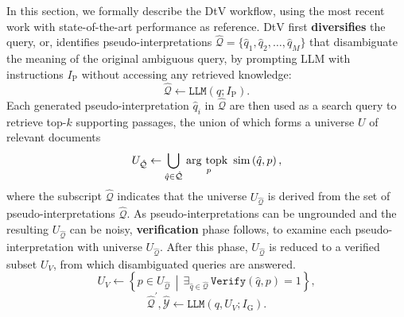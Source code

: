 In this section, we formally describe 
the DtV workflow, using the most recent work \citet{in-etal-2024-diversify-arxiv} with state-of-the-art performance as reference.
DtV first \textbf{diversifies} the query, or, identifies pseudo-interpretations \( \hat{\mathcal{Q}} = \{\hat{q}_1, \hat{q}_2, \dots, \hat{q}_M\} \) that disambiguate the meaning of the original ambiguous query, by prompting LLM with instructions $I_{\textrm{P}}$ without accessing any retrieved knowledge:
\begin{equation}
\hat{\mathcal{Q}} \leftarrow \texttt{LLM}(q 
; I_\text{P}).
\label{eq:diva_q_extract}
\end{equation}
Each generated pseudo-interpretation $\hat{q}_i$ in $\hat{\mathcal{Q}}$ are then used as a search query to retrieve top-$k$ supporting
passages, the union of which
forms a universe $U$
of relevant documents
\begin{equation}
U_{\hat{\mathcal{Q}}} \leftarrow \bigcup_{\hat{q}\in\hat{\mathcal{Q}}}\, \argtopk_{p} \mathrm{sim} \left( \hat{q}, p \right),
\label{eq:diva_form_universe}
\end{equation}
where the subscript $\hat{\mathcal{Q}}$ indicates that the universe $U_{\hat{\mathcal{Q}}}$ is derived from the set of pseudo-interpretations $\hat{\mathcal{Q}}$.
As pseudo-interpretations can be ungrounded and the resulting $U_{\hat{\mathcal{Q}}}$ can be noisy,
\textbf{verification} phase follows, to examine each pseudo-interpretation 
with universe $U_{\hat{\mathcal{Q}}}$.
After this phase,
$U_{\hat{\mathcal{Q}}}$ is reduced to a verified subset 
$U_V$,
from which disambiguated queries are answered.
\begin{equation}
U_V
\leftarrow \left\{
p\in U_{\hat{\mathcal{Q}}}
\,\middle|\, 
\exists_{\hat{q} \in \hat{\mathcal{Q}}}\,
\texttt{Verify}(\hat{q}, p)=1 \right\},
\end{equation}
\begin{equation}
\hat{\mathcal{Q}}^\prime, \hat{\mathcal{Y}} \leftarrow 
\texttt{LLM}(q, U_{V}; I_{\textrm{G}}).
\label{eq:diva_answer_gen}
\end{equation}

